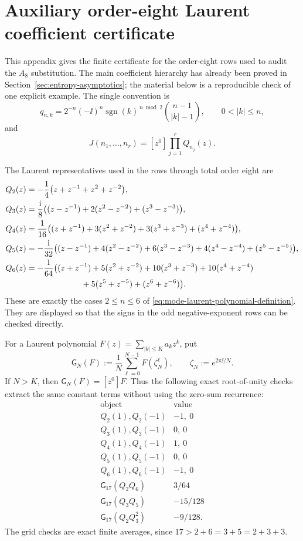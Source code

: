 \section{Auxiliary order-eight Laurent coefficient certificate}%
\label{app:order-eight-laurent-certificate}

This appendix gives the finite certificate for the order-eight rows used to
audit the \(A_8\) substitution.  The main coefficient hierarchy has already
been proved in Section~\ref{sec:entropy-asymptotics}; the material below is
a reproducible check of one explicit example.  The single convention is
\[
q_{n,k}=2^{-n}(-\ii)^n
\operatorname{sgn}(k)^{\,n\bmod2}
\binom{n-1}{|k|-1},
\qquad 0<|k|\le n,
\]
and
\[
J(n_1,\ldots,n_r)=[z^0]\prod_{j=1}^rQ_{n_j}(z).
\]

The Laurent representatives used in the rows through total order eight are
\begin{align}
Q_2(z)
&=-\frac14\bigl(z+z^{-1}+z^2+z^{-2}\bigr),
\label{eq:appendix-d-explicit-q2}\\
Q_3(z)
&=\frac{\mathrm{i}}{8}\bigl((z-z^{-1})+2(z^2-z^{-2})+(z^3-z^{-3})\bigr),
\label{eq:appendix-d-explicit-q3}\\
Q_4(z)
&=\frac1{16}\bigl((z+z^{-1})+3(z^2+z^{-2})
  +3(z^3+z^{-3})+(z^4+z^{-4})\bigr),
\label{eq:appendix-d-explicit-q4}\\
Q_5(z)
&=-\frac{\mathrm{i}}{32}\bigl((z-z^{-1})+4(z^2-z^{-2})
  +6(z^3-z^{-3})+4(z^4-z^{-4})+(z^5-z^{-5})\bigr),
\label{eq:appendix-d-explicit-q5}\\
Q_6(z)
&=-\frac1{64}\bigl((z+z^{-1})+5(z^2+z^{-2})
  +10(z^3+z^{-3})+10(z^4+z^{-4}) \nonumber\\
&\hspace{6.7em}
  +5(z^5+z^{-5})+(z^6+z^{-6})\bigr).
\label{eq:appendix-d-explicit-q6}
\end{align}
These are exactly the cases \(2\le n\le6\) of
\eqref{eq:mode-laurent-polynomial-definition}.  They are displayed so that
the signs in the odd negative-exponent rows can be checked directly.

For a Laurent polynomial \(F(z)=\sum_{|k|\le K}a_kz^k\), put
\[
\mathsf G_N(F):=\frac1N\sum_{\ell=0}^{N-1}F(\zeta_N^\ell),
\qquad \zeta_N:=e^{2\pi\ii/N}.
\]
If \(N>K\), then \(\mathsf G_N(F)=[z^0]F\).  Thus the following exact
root-of-unity checks extract the same constant terms without using the
zero-sum recurrence:
\[
\begin{array}{c|c}
\text{object}&\text{value}\\
\hline
Q_2(1),Q_2(-1)&-1,\ 0\\
Q_3(1),Q_3(-1)&0,\ 0\\
Q_4(1),Q_4(-1)&1,\ 0\\
Q_5(1),Q_5(-1)&0,\ 0\\
Q_6(1),Q_6(-1)&-1,\ 0\\
\mathsf G_{17}(Q_2Q_6)&3/64\\
\mathsf G_{17}(Q_3Q_5)&-15/128\\
\mathsf G_{17}(Q_2Q_3^2)&-9/128 .
\end{array}
\]
The grid checks are exact finite averages, since
\(17>2+6=3+5=2+3+3\).

